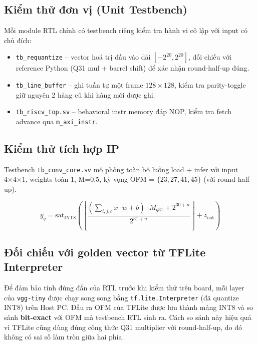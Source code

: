 \subsection{Kiểm thử đơn vị (Unit Testbench)}
Mỗi module RTL chính có testbench riêng kiểm tra hành vi cô lập với input có chủ đích:
\begin{itemize}
    \item \texttt{tb\_requantize} -- vector hoá trị đầu vào dải $[-2^{20}, 2^{20}]$, đối chiếu với reference Python (Q31 mul + barrel shift) để xác nhận round-half-up đúng.
    \item \texttt{tb\_line\_buffer} -- ghi tuần tự một frame $128 \times 128$, kiểm tra parity-toggle giữ nguyên 2 hàng cũ khi hàng mới được ghi.
    \item \texttt{tb\_riscv\_top.sv} -- behavioral instr memory đáp NOP, kiểm tra fetch advance qua \texttt{m\_axi\_instr}.
\end{itemize}

\subsection{Kiểm thử tích hợp IP}
\label{ssec:tb-ip}
Testbench \texttt{tb\_conv\_core.sv} mô phỏng toàn bộ luồng load + infer
với input 4×4×1, weights toàn 1, M=0.5, kỳ vọng OFM = $\{23, 27, 41, 45\}$
(với round-half-up).

\begin{equation}
    y_{q} = \mathrm{sat}_{\mathrm{INT8}}\!\left(
        \left\lfloor \frac{(\sum_{i,j,c} x \cdot w + b) \cdot M_{q31} + 2^{30+n}}{2^{31+n}} \right\rfloor + z_{\mathrm{out}}
    \right)
\end{equation}

\subsection{Đối chiếu với golden vector từ TFLite Interpreter}
Để đảm bảo tính đúng đắn của RTL trước khi kiểm thử trên board, mỗi layer của \texttt{vgg-tiny} được chạy song song bằng \texttt{tf.lite.Interpreter} (đã quantize INT8) trên Host PC. Đầu ra OFM của TFLite được lưu thành mảng INT8 và so sánh \textbf{bit-exact} với OFM mà testbench RTL sinh ra. Cách so sánh này hiệu quả vì TFLite cũng dùng đúng công thức Q31 multiplier với round-half-up, do đó không có sai số làm tròn giữa hai phía.

